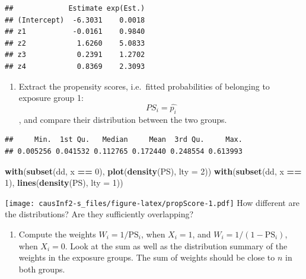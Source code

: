 \documentclass[
]{book}
\newenvironment{Shaded}{\begin{snugshade}}{\end{snugshade}}
\newcommand{\AttributeTok}[1]{\textcolor[rgb]{0.13,0.29,0.53}{#1}}
\newcommand{\DecValTok}[1]{\textcolor[rgb]{0.00,0.00,0.81}{#1}}
\newcommand{\FunctionTok}[1]{\textcolor[rgb]{0.13,0.29,0.53}{\textbf{#1}}}
\newcommand{\NormalTok}[1]{#1}
\newcommand{\OtherTok}[1]{\textcolor[rgb]{0.56,0.35,0.01}{#1}}
\newcommand{\SpecialCharTok}[1]{\textcolor[rgb]{0.81,0.36,0.00}{\textbf{#1}}}
\newcommand{\StringTok}[1]{\textcolor[rgb]{0.31,0.60,0.02}{#1}}
\providecommand{\tightlist}{%
  \setlength{\itemsep}{0pt}\setlength{\parskip}{0pt}}
\begin{document}
\begin{verbatim}
##             Estimate exp(Est.)
## (Intercept)  -6.3031    0.0018
## z1           -0.0161    0.9840
## z2            1.6260    5.0833
## z3            0.2391    1.2702
## z4            0.8369    2.3093
\end{verbatim}

\begin{enumerate}
\def\labelenumi{\arabic{enumi}.}
\setcounter{enumi}{1}
\tightlist
\item
  Extract the propensity scores, i.e.~fitted
  probabilities of belonging to exposure group 1:
  \[ PS_i = \widehat{p_i} \],
  and compare their distribution between the two groups.
\end{enumerate}

\begin{Shaded}
\end{Shaded}

\begin{verbatim}
##     Min.  1st Qu.   Median     Mean  3rd Qu.     Max. 
## 0.005256 0.041532 0.112765 0.172440 0.248554 0.613993
\end{verbatim}

\begin{Shaded}
\begin{Highlighting}[]
\FunctionTok{with}\NormalTok{(}\FunctionTok{subset}\NormalTok{(dd, x }\SpecialCharTok{==} \DecValTok{0}\NormalTok{), }\FunctionTok{plot}\NormalTok{(}\FunctionTok{density}\NormalTok{(PS), }\AttributeTok{lty =} \DecValTok{2}\NormalTok{))}
\FunctionTok{with}\NormalTok{(}\FunctionTok{subset}\NormalTok{(dd, x }\SpecialCharTok{==} \DecValTok{1}\NormalTok{), }\FunctionTok{lines}\NormalTok{(}\FunctionTok{density}\NormalTok{(PS), }\AttributeTok{lty =} \DecValTok{1}\NormalTok{))}
\end{Highlighting}
\end{Shaded}

\texttt{[image: causInf2-s\_files/figure-latex/propScore-1.pdf]}
How different are the distributions? Are they sufficiently overlapping?

\begin{enumerate}
\def\labelenumi{\arabic{enumi}.}
\setcounter{enumi}{2}
\tightlist
\item
  Compute the weights \(W_i = 1/\text{PS}_i\), when \(X_i=1\),
  and \(W_i = 1/(1-\text{PS}_i)\), when \(X_i=0\).
  Look at the sum as well as the distribution summary
  of the weights in the exposure groups. The sum of weights
  should be close to \(n\) in both groups.
\end{enumerate}
\end{document}
